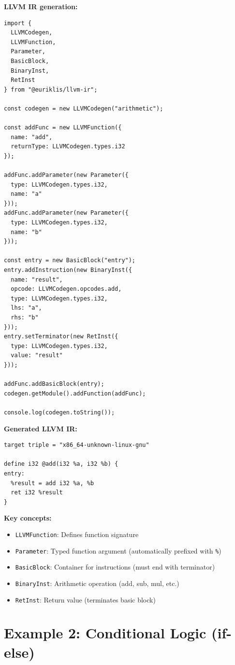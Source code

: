 \documentclass[11pt,oneside]{book}
\begin{document}
\textbf{LLVM IR generation:}
\begin{lstlisting}[style=ts]
import {
  LLVMCodegen,
  LLVMFunction,
  Parameter,
  BasicBlock,
  BinaryInst,
  RetInst
} from "@euriklis/llvm-ir";

const codegen = new LLVMCodegen("arithmetic");

const addFunc = new LLVMFunction({
  name: "add",
  returnType: LLVMCodegen.types.i32
});

addFunc.addParameter(new Parameter({
  type: LLVMCodegen.types.i32,
  name: "a"
}));
addFunc.addParameter(new Parameter({
  type: LLVMCodegen.types.i32,
  name: "b"
}));

const entry = new BasicBlock("entry");
entry.addInstruction(new BinaryInst({
  name: "result",
  opcode: LLVMCodegen.opcodes.add,
  type: LLVMCodegen.types.i32,
  lhs: "a",
  rhs: "b"
}));
entry.setTerminator(new RetInst({
  type: LLVMCodegen.types.i32,
  value: "result"
}));

addFunc.addBasicBlock(entry);
codegen.getModule().addFunction(addFunc);

console.log(codegen.toString());
\end{lstlisting}

\textbf{Generated LLVM IR:}
\begin{lstlisting}[style=ir]
target triple = "x86_64-unknown-linux-gnu"

define i32 @add(i32 %a, i32 %b) {
entry:
  %result = add i32 %a, %b
  ret i32 %result
}
\end{lstlisting}

\textbf{Key concepts:}
\begin{itemize}[noitemsep]
  \item \texttt{LLVMFunction}: Defines function signature
  \item \texttt{Parameter}: Typed function argument (automatically prefixed with \texttt{\%})
  \item \texttt{BasicBlock}: Container for instructions (must end with terminator)
  \item \texttt{BinaryInst}: Arithmetic operation (add, sub, mul, etc.)
  \item \texttt{RetInst}: Return value (terminates basic block)
\end{itemize}

\section{Example 2: Conditional Logic (if-else)}
\end{document}
